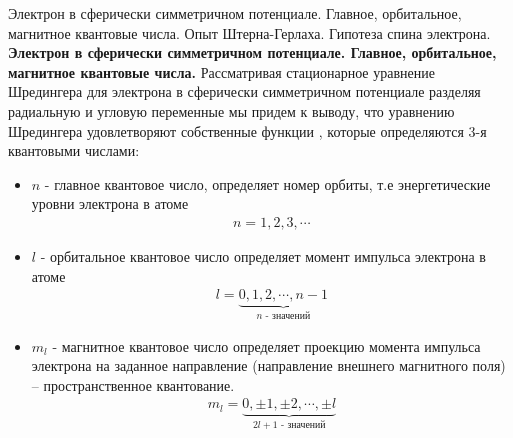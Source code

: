 \documentclass[__main__.tex]{subfiles}
\begin{document}
	
	Электрон в сферически симметричном потенциале. Главное, орбитальное, магнитное квантовые числа. Опыт Штерна-Герлаха. Гипотеза спина электрона.\\ 
	
\textbf{Электрон в сферически симметричном потенциале. Главное, орбитальное, магнитное квантовые числа.}
Рассматривая стационарное уравнение Шредингера для электрона в сферически симметричном потенциале разделяя радиальную и угловую переменные мы придем к выводу, что уравнению Шредингера удовлетворяют собственные функции , которые определяются 3-я квантовыми числами:
\begin{itemize}
	\item $n$ - главное квантовое число, определяет номер орбиты, т.е энергетические уровни электрона в атоме
	\begin{gather*}
		n = 1,2,3,\cdots
	\end{gather*}
	\item $l$ - орбитальное квантовое число определяет момент импульса электрона в атоме
	\begin{gather*}
		l = \underbrace{0,1,2,\cdots,n-1}_{\text{$n$ - значений}}
	\end{gather*}
	\item $m_l$ - магнитное квантовое число определяет проекцию момента импульса электрона на заданное направление (направление внешнего магнитного поля) – пространственное квантование.
	\begin{gather*}
		m_l = \underbrace{0,\pm1,\pm2,\cdots,\pm l}_{\text{$2l+1$ - значений}}
	\end{gather*}
\end{itemize}
\end{document}
